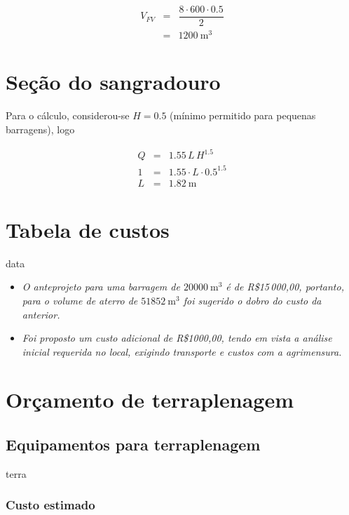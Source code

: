 \documentclass[a4paper, 12pt, brazilian]{article}
\begin{document}
	\begin{eqnarray}
		V_{FV}&=&\dfrac{8\cdot 600\cdot 0.5}{2}\\
		&=&\SI{1200}{\meter^{3}}
	\end{eqnarray}
	
	\section{Seção do sangradouro}
	
	Para o cálculo, considerou-se $H=0.5$ (mínimo permitido para pequenas barragens), logo
	
	\begin{eqnarray}
		Q&=&1.55\,L\,H^{1.5}\\
		1&=&1.55\cdot L\cdot 0.5^{1.5}\\
		L&=&\SI{1.82}{\meter}
	\end{eqnarray}
	
	\section{Tabela de custos}
	
	{data}
	
	\begin{small}
		\begin{itemize}
			\item\textit{O anteprojeto para uma barragem de $\SI{20000}{\meter^{3}}$ é de \textrm{R\$15\,000,00}, portanto, para o volume de aterro de $\SI{51852}{\meter^{3}}$ foi sugerido o dobro do custo da anterior.}
			\item\textit{Foi proposto um custo adicional de R\$1000,00, tendo em vista a análise inicial requerida no local, exigindo transporte e custos com a agrimensura.}
		\end{itemize}
	\end{small}
	
	\newpage
	
	\section{Orçamento de terraplenagem}
	
	\subsection{Equipamentos para terraplenagem}
	
	{terra}
	
	\subsubsection{Custo estimado}
	
\end{document}
